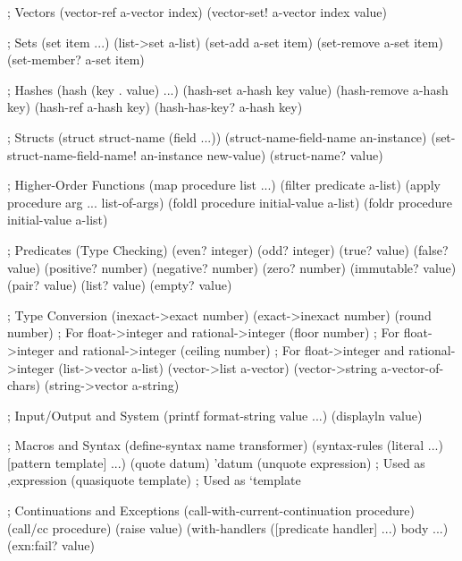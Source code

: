 \begin{racketcode}
; Vectors
(vector-ref a-vector index)
(vector-set! a-vector index value)

; Sets
(set item ...)
(list->set a-list)
(set-add a-set item)
(set-remove a-set item)
(set-member? a-set item)

; Hashes
(hash (key . value) ...)
(hash-set a-hash key value)
(hash-remove a-hash key)
(hash-ref a-hash key)
(hash-has-key? a-hash key)

; Structs
(struct struct-name (field ...))
(struct-name-field-name an-instance)
(set-struct-name-field-name! an-instance new-value)
(struct-name? value)

; Higher-Order Functions
(map procedure list ...)
(filter predicate a-list)
(apply procedure arg ... list-of-args)
(foldl procedure initial-value a-list)
(foldr procedure initial-value a-list)

; Predicates (Type Checking)
(even? integer)
(odd? integer)
(true? value)
(false? value)
(positive? number)
(negative? number)
(zero? number)
(immutable? value)
(pair? value)
(list? value)
(empty? value)

; Type Conversion
(inexact->exact number)
(exact->inexact number)
(round number) ; For float->integer and rational->integer
(floor number) ; For float->integer and rational->integer
(ceiling number) ; For float->integer and rational->integer
(list->vector a-list)
(vector->list a-vector)
(vector->string a-vector-of-chars)
(string->vector a-string)

; Input/Output and System
(printf format-string value ...)
(displayln value)

; Macros and Syntax
(define-syntax name transformer)
(syntax-rules (literal ...) [pattern template] ...)
(quote datum)
'datum
(unquote expression) ; Used as ,expression
(quasiquote template) ; Used as `template

; Continuations and Exceptions
(call-with-current-continuation procedure)
(call/cc procedure)
(raise value)
(with-handlers ([predicate handler] ...) body ...)
(exn:fail? value)
\end{racketcode}